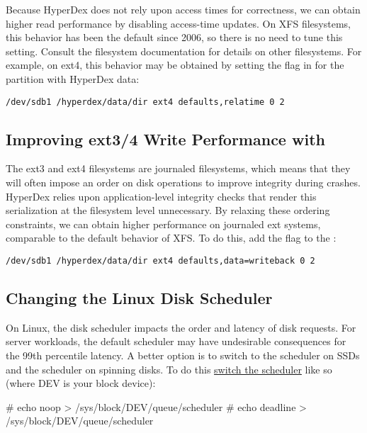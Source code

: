 Because HyperDex does not rely upon access times for correctness, we can obtain
higher read performance by disabling access-time updates.  On XFS filesystems,
this behavior has been the default since 2006, so there is no need to tune this
setting.  Consult the filesystem documentation for details on other filesystems.
For example, on ext4, this behavior may be obtained by setting the
 flag in  for the partition with HyperDex data:

\begin{verbatim}
/dev/sdb1 /hyperdex/data/dir ext4 defaults,relatime 0 2
\end{verbatim}

\subsection{Improving ext3/4 Write Performance with }

The ext3 and ext4 filesystems are journaled filesystems, which means that they
will often impose an order on disk operations to improve integrity during
crashes.  HyperDex relies upon application-level integrity checks that render
this serialization at the filesystem level unnecessary.  By relaxing these
ordering constraints, we can obtain higher performance on journaled ext systems,
comparable to the default behavior of XFS.  To do this, add the flag
 to the :

\begin{verbatim}
/dev/sdb1 /hyperdex/data/dir ext4 defaults,data=writeback 0 2
\end{verbatim}

\subsection{Changing the Linux Disk Scheduler}

On Linux, the disk scheduler impacts the order and latency of disk requests.
For server workloads, the default scheduler may have undesirable consequences
for the 99th percentile latency.  A better option is to switch to the
 scheduler on SSDs and the  scheduler on spinning
disks.  To do this
\href{https://www.kernel.org/doc/Documentation/block/switching-sched.txt}{switch
the scheduler} like so (where DEV is your block device):

\begin{consolecode}
# echo noop > /sys/block/DEV/queue/scheduler
# echo deadline > /sys/block/DEV/queue/scheduler
\end{consolecode}

